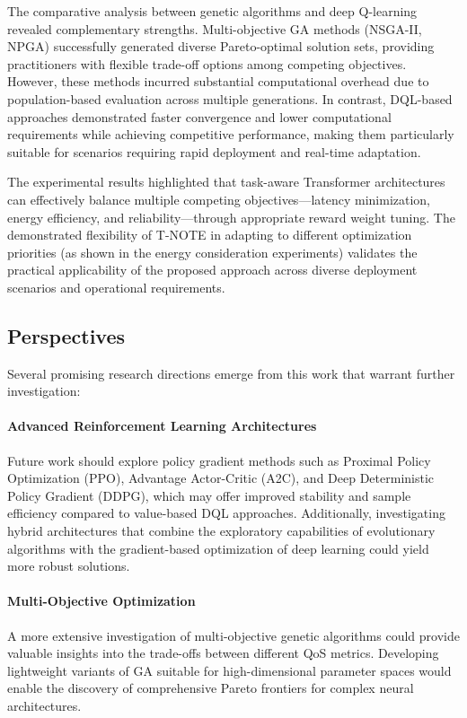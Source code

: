 \documentclass[preprint,3p,authoryear]{elsarticle}
\begin{document}
The comparative analysis between genetic algorithms and deep Q-learning revealed complementary strengths. Multi-objective GA methods (NSGA-II, NPGA) successfully generated diverse Pareto-optimal solution sets, providing practitioners with flexible trade-off options among competing objectives. However, these methods incurred substantial computational overhead due to population-based evaluation across multiple generations. In contrast, DQL-based approaches demonstrated faster convergence and lower computational requirements while achieving competitive performance, making them particularly suitable for scenarios requiring rapid deployment and real-time adaptation.

The experimental results highlighted that task-aware Transformer architectures can effectively balance multiple competing objectives—latency minimization, energy efficiency, and reliability—through appropriate reward weight tuning. The demonstrated flexibility of T-NOTE in adapting to different optimization priorities (as shown in the energy consideration experiments) validates the practical applicability of the proposed approach across diverse deployment scenarios and operational requirements.

\subsection{Perspectives}

Several promising research directions emerge from this work that warrant further investigation:

\paragraph{Advanced Reinforcement Learning Architectures}
Future work should explore policy gradient methods such as Proximal Policy Optimization (PPO), Advantage Actor-Critic (A2C), and Deep Deterministic Policy Gradient (DDPG), which may offer improved stability and sample efficiency compared to value-based DQL approaches. Additionally, investigating hybrid architectures that combine the exploratory capabilities of evolutionary algorithms with the gradient-based optimization of deep learning could yield more robust solutions.

\paragraph{Multi-Objective Optimization}
A more extensive investigation of multi-objective genetic algorithms could provide valuable insights into the trade-offs between different QoS metrics. Developing lightweight variants of GA suitable for high-dimensional parameter spaces would enable the discovery of comprehensive Pareto frontiers for complex neural architectures.
\end{document}
